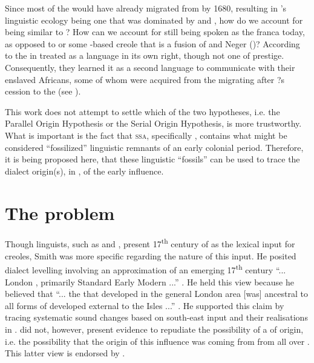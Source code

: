 Since most of the  would have already migrated from  by 1680, resulting in 's linguistic ecology being one that was dominated by  and , how do we account for  being similar to ? How can we account for  still being spoken as the  franca today, as opposed to  or some -based creole that is a fusion of  and Neger  ()? According to \citet{Holm94} the  in  treated  as a language in its own right, though not one of prestige. Consequently, they learned it as a second language to communicate with their enslaved Africans, some of whom were acquired from the migrating  after ?s cession to the  (see ).

This work does not attempt to settle which of the two hypotheses, i.e. the Parallel Origin Hypothesis or the Serial Origin Hypothesis, is more trustworthy. What is important is the fact that \textsc{ssa}, specifically , contains what might be considered ``fossilized'' linguistic remnants of an early  colonial period. Therefore, it is being proposed here, that these linguistic ``fossils'' can be used to trace the dialect origin(s), in , of the early  influence.

\section{The problem} \label{1.3}

Though linguists, such as \citet{Smith08, Smith87} and \citet{Mufwene08, Mufwene01}, present 17\textsuperscript{th} century  of  as the lexical input for  creoles, Smith was more specific regarding the nature of this input. He posited dialect levelling involving an approximation of an emerging 17\textsuperscript{th} century ``... London , primarily Standard Early Modern  ...'' \citep[118]{Smith08}. He held this view because he believed that ``... the  that developed in the general London area [was] ancestral to all forms of  developed external to the  Isles ...'' \citep[118]{Smith08}. He supported this claim by tracing systematic sound changes based on south-east   input and their realisations in . \citet{Smith08, Smith87} did not, however, present evidence to repudiate the possibility of a  of origin, i.e. the possibility that the origin of this influence was coming from  from all over . This latter view is endorsed by \citet{Mufwene08, Mufwene01}.

